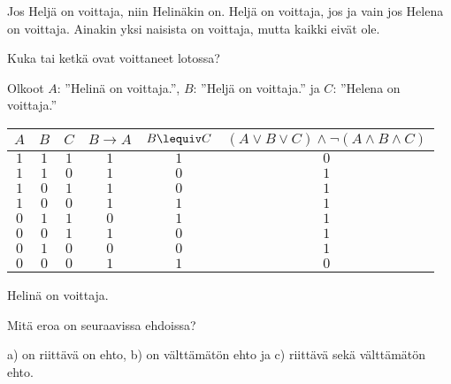 \begin{kotitehtavasivu}
\begin{tehtava}
Jos Heljä on voittaja, niin Helinäkin on. 
Heljä on voittaja, jos ja vain jos Helena on voittaja.
Ainakin yksi naisista on voittaja, mutta kaikki eivät ole.

Kuka tai ketkä ovat voittaneet lotossa?

    \begin{vastaus}
    
        Olkoot $A$: ''Helinä on voittaja.'', $B$: ''Heljä on voittaja.'' ja $C$: ''Helena on voittaja.''
        \begin{center}
		    \begin{tabular}{|c|c|c|c|c|c|}\hline
		    $A$ & $B$ & $C$ & $B\to A$ & $B\lequiv C$ & $(A\lor B\lor C)\land \lnot(A\land B\land C)$ \\ \hline
		    $1$ & $1$ & $1$ & $1$ & $1$ & $0$ \\ %
		    $1$ & $1$ & $0$ & $1$ & $0$ & $1$ \\
		    $1$ & $0$ & $1$ & $1$ & $0$ & $1$ \\
		    $1$ & $0$ & $0$ & $1$ & $1$ & $1$ \\
		    $0$ & $1$ & $1$ & $0$ & $1$ & $1$ \\
		    $0$ & $0$ & $1$ & $1$ & $0$ & $1$ \\
		    $0$ & $1$ & $0$ & $0$ & $0$ & $1$ \\
		    $0$ & $0$ & $0$ & $1$ & $1$ & $0$ \\ \hline
\end{tabular}
\end{center}
Helinä on voittaja.
    \end{vastaus}
    
\end{tehtava}

\begin{tehtava}
     Mitä eroa on seuraavissa ehdoissa?

    \begin{vastaus}
        a) on riittävä on ehto, b) on välttämätön ehto ja c) riittävä sekä välttämätön ehto. %
    \end{vastaus}
    
\end{tehtava}


\end{kotitehtavasivu}
